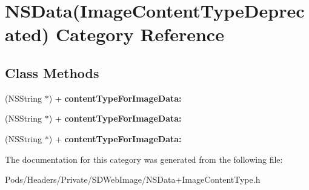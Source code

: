 \hypertarget{category_n_s_data_07_image_content_type_deprecated_08}{}\section{N\+S\+Data(Image\+Content\+Type\+Deprecated) Category Reference}
\label{category_n_s_data_07_image_content_type_deprecated_08}
\subsection*{Class Methods}
\begin{DoxyCompactItemize}
\item 
\mbox{\label{category_n_s_data_07_image_content_type_deprecated_08_a90adbfece4a5ae6698fcdc02eba19bf3}} 
(N\+S\+String $\ast$) + {\bfseries content\+Type\+For\+Image\+Data\+:}
\item 
\mbox{\label{category_n_s_data_07_image_content_type_deprecated_08_a90adbfece4a5ae6698fcdc02eba19bf3}} 
(N\+S\+String $\ast$) + {\bfseries content\+Type\+For\+Image\+Data\+:}
\item 
\mbox{\label{category_n_s_data_07_image_content_type_deprecated_08_a90adbfece4a5ae6698fcdc02eba19bf3}} 
(N\+S\+String $\ast$) + {\bfseries content\+Type\+For\+Image\+Data\+:}
\end{DoxyCompactItemize}


The documentation for this category was generated from the following file\+:\begin{DoxyCompactItemize}
\item 
Pods/\+Headers/\+Private/\+S\+D\+Web\+Image/N\+S\+Data+\+Image\+Content\+Type.\+h\end{DoxyCompactItemize}

